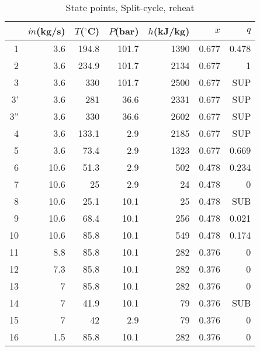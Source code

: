 \documentclass[review,3p]{elsarticle}
\begin{document}
\begin{table}[H]
\centering
\caption{State points, Split-cycle, reheat}
%
\scriptsize

\begin{tabular}{rrrrrrr}
\toprule
 & $\dot{m}$(kg/s)&  $T$($^{\circ}$C) &  $P$(bar) &  $h$(kJ/kg) & $x$ &  $q$ \\
 \midrule

 1 & 3.6 & 194.8 & 101.7 & 1390 & 0.677 & 0.478 \\

 2 & 3.6 & 234.9 & 101.7 & 2134 & 0.677 &  1 \\

 3 & 3.6 & 330 & 101.7 & 2500 & 0.677 & SUP \\

3' & 3.6 & 281 & 36.6 & 2331 & 0.677 & SUP \\

3'' & 3.6 & 330 & 36.6 & 2602 & 0.677 & SUP \\

 4 & 3.6 & 133.1 & 2.9 & 2185 & 0.677 & SUP \\

 5 & 3.6 & 73.4 & 2.9 & 1323 & 0.677 & 0.669 \\

 6 & 10.6 & 51.3 & 2.9 & 502 & 0.478 & 0.234 \\

 7 & 10.6 & 25 & 2.9 & 24 & 0.478 &  0 \\

 8 & 10.6 & 25.1 & 10.1 & 25 & 0.478 & SUB \\

 9 & 10.6 & 68.4 & 10.1 & 256 & 0.478 & 0.021 \\

10 & 10.6 & 85.8 & 10.1 & 549 & 0.478 & 0.174 \\

11 & 8.8 & 85.8 & 10.1 & 282 & 0.376 &  0 \\

12 & 7.3 & 85.8 & 10.1 & 282 & 0.376 &  0 \\

13 &  7 & 85.8 & 10.1 & 282 & 0.376 &  0 \\

14 &  7 & 41.9 & 10.1 & 79 & 0.376 & SUB \\

15 &  7 & 42 & 2.9 & 79 & 0.376 &  0 \\

16 & 1.5 & 85.8 & 10.1 & 282 & 0.376 &  0 \\


\end{tabular}
\end{table}
\end{document}
